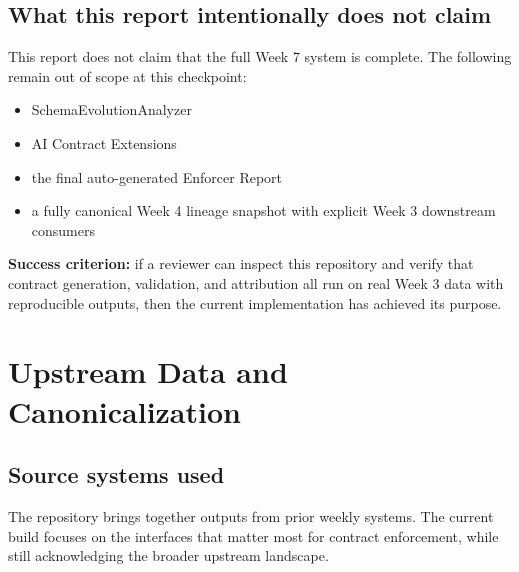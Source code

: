 \documentclass[11pt]{report}
\begin{document}
\section{What this report intentionally does not claim}
This report does not claim that the full Week 7 system is complete. The following remain out of scope at this checkpoint:

\begin{itemize}[leftmargin=1.5em]
  \item SchemaEvolutionAnalyzer
  \item AI Contract Extensions
  \item the final auto-generated Enforcer Report
  \item a fully canonical Week 4 lineage snapshot with explicit Week 3 downstream consumers
\end{itemize}

\begin{callout}
\textbf{Success criterion:} if a reviewer can inspect this repository and verify that contract generation, validation, and attribution all run on real Week 3 data with reproducible outputs, then the current implementation has achieved its purpose.
\end{callout}

\clearpage
\chapter{Upstream Data and Canonicalization}

\section{Source systems used}
The repository brings together outputs from prior weekly systems. The current build focuses on the interfaces that matter most for contract enforcement, while still acknowledging the broader upstream landscape.
\end{document}
